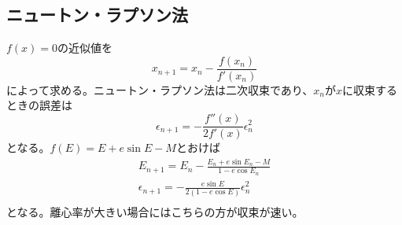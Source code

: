 	\subsection{ニュートン・ラプソン法}
		$f(x) = 0$の近似値を
			\[x_{n+1} = x_n - \frac{f(x_n)}{f'(x_n)}\]
		によって求める。ニュートン・ラプソン法は二次収束であり、$x_n$が$x$に収束するときの誤差は
			\[\epsilon_{n+1} = - \frac{f''(x)}{2f'(x)}\epsilon_n^2\]
		となる。$f(E) = E + e\sin E - M$とおけば
		\begin{gather*}
			E_{n+1} = E_n - \frac{E_n + e\sin E_n - M}{1 - e\cos E_n}\\
			\epsilon_{n+1} = - \frac{e\sin E}{2(1 - e\cos E)}\epsilon_n^2\\
		\end{gather*}
		となる。離心率が大きい場合にはこちらの方が収束が速い。